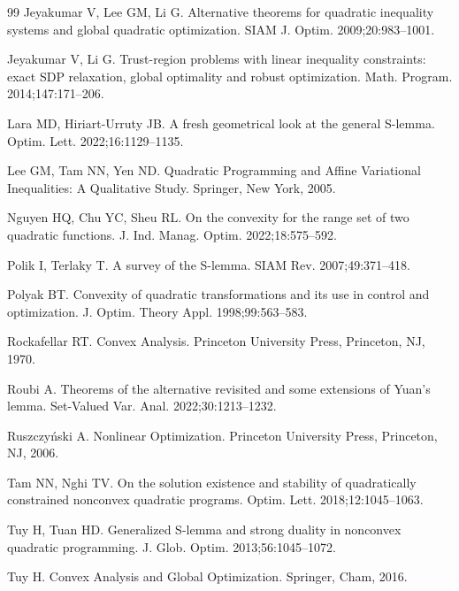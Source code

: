 \documentclass[]{interact}
\theoremstyle{plain}%
\theoremstyle{definition}
\theoremstyle{remark}
\begin{document}
\begin{thebibliography}{99}
		Jeyakumar V, Lee GM, Li G.
		Alternative theorems for quadratic inequality systems and global quadratic optimization.
		{SIAM J. Optim.} 2009;20:983--1001.
		
		Jeyakumar V, Li G.
		Trust-region problems with linear inequality constraints: exact SDP relaxation, global optimality and robust optimization.
		{Math. Program.} 2014;147:171--206.
		
		Lara MD, Hiriart-Urruty JB.
		A fresh geometrical look at the general S-lemma.
		{Optim. Lett.} 2022;16:1129--1135.
		
		Lee GM, Tam NN, Yen ND.
		{Quadratic Programming and Affine Variational Inequalities: A Qualitative Study}.
		Springer, New York, 2005.
		
		Nguyen HQ, Chu YC, Sheu RL.
		On the convexity for the range set of two quadratic functions.
		{J. Ind. Manag. Optim.} 2022;18:575--592.
		
		Polik I, Terlaky T.
		A survey of the S-lemma.
		{SIAM Rev.} 2007;49:371--418.
		
		Polyak BT.
		Convexity of quadratic transformations and its use in control and optimization.
		{J. Optim. Theory Appl.} 1998;99:563--583.
		
		Rockafellar RT.
		{Convex Analysis}.
		Princeton University Press, Princeton, NJ, 1970.
		
		Roubi A.
		Theorems of the alternative revisited and some extensions of Yuan's lemma.
		{Set-Valued Var. Anal.} 2022;30:1213--1232.
		
		Ruszczy\'nski A.
		{Nonlinear Optimization}.
		Princeton University Press, Princeton, NJ, 2006.
		
		Tam NN, Nghi TV.
		On the solution existence and stability of quadratically constrained nonconvex quadratic programs.
		{Optim. Lett.} 2018;12:1045--1063.
		
		Tuy H, Tuan HD.
		Generalized S-lemma and strong duality in nonconvex quadratic programming.
		{J. Glob. Optim.} 2013;56:1045--1072.
		
		Tuy H.
		{Convex Analysis and Global Optimization}.
		Springer, Cham, 2016.
		
		
		
	\end{thebibliography}
	
\end{document}
